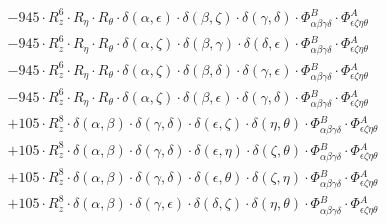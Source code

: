 \documentclass{article}
\begin{document}
\begin{equation}
\begin{array}{c}
 \\[0.2em] 		 - 945 \cdot R_{z}^{6} \cdot R_{\eta{}} \cdot R_{\theta{}} \cdot \delta{}\left(\alpha{}, \epsilon{}\right) \cdot \delta{}\left(\beta{}, \zeta{}\right) \cdot \delta{}\left(\gamma{}, \delta{}\right) \cdot \Phi{}^{B}_{\alpha{}\beta{}\gamma{}\delta{}} \cdot \Phi{}^{A}_{\epsilon{}\zeta{}\eta{}\theta{}} 
 \\[0.2em] 		 - 945 \cdot R_{z}^{6} \cdot R_{\eta{}} \cdot R_{\theta{}} \cdot \delta{}\left(\alpha{}, \zeta{}\right) \cdot \delta{}\left(\beta{}, \gamma{}\right) \cdot \delta{}\left(\delta{}, \epsilon{}\right) \cdot \Phi{}^{B}_{\alpha{}\beta{}\gamma{}\delta{}} \cdot \Phi{}^{A}_{\epsilon{}\zeta{}\eta{}\theta{}} 
 \\[0.2em] 		 - 945 \cdot R_{z}^{6} \cdot R_{\eta{}} \cdot R_{\theta{}} \cdot \delta{}\left(\alpha{}, \zeta{}\right) \cdot \delta{}\left(\beta{}, \delta{}\right) \cdot \delta{}\left(\gamma{}, \epsilon{}\right) \cdot \Phi{}^{B}_{\alpha{}\beta{}\gamma{}\delta{}} \cdot \Phi{}^{A}_{\epsilon{}\zeta{}\eta{}\theta{}} 
 \\[0.2em] 		 - 945 \cdot R_{z}^{6} \cdot R_{\eta{}} \cdot R_{\theta{}} \cdot \delta{}\left(\alpha{}, \zeta{}\right) \cdot \delta{}\left(\beta{}, \epsilon{}\right) \cdot \delta{}\left(\gamma{}, \delta{}\right) \cdot \Phi{}^{B}_{\alpha{}\beta{}\gamma{}\delta{}} \cdot \Phi{}^{A}_{\epsilon{}\zeta{}\eta{}\theta{}} 
 \\[0.2em] 		 + 105 \cdot R_{z}^{8} \cdot \delta{}\left(\alpha{}, \beta{}\right) \cdot \delta{}\left(\gamma{}, \delta{}\right) \cdot \delta{}\left(\epsilon{}, \zeta{}\right) \cdot \delta{}\left(\eta{}, \theta{}\right) \cdot \Phi{}^{B}_{\alpha{}\beta{}\gamma{}\delta{}} \cdot \Phi{}^{A}_{\epsilon{}\zeta{}\eta{}\theta{}} 
 \\[0.2em] 		 + 105 \cdot R_{z}^{8} \cdot \delta{}\left(\alpha{}, \beta{}\right) \cdot \delta{}\left(\gamma{}, \delta{}\right) \cdot \delta{}\left(\epsilon{}, \eta{}\right) \cdot \delta{}\left(\zeta{}, \theta{}\right) \cdot \Phi{}^{B}_{\alpha{}\beta{}\gamma{}\delta{}} \cdot \Phi{}^{A}_{\epsilon{}\zeta{}\eta{}\theta{}} 
 \\[0.2em] 		 + 105 \cdot R_{z}^{8} \cdot \delta{}\left(\alpha{}, \beta{}\right) \cdot \delta{}\left(\gamma{}, \delta{}\right) \cdot \delta{}\left(\epsilon{}, \theta{}\right) \cdot \delta{}\left(\zeta{}, \eta{}\right) \cdot \Phi{}^{B}_{\alpha{}\beta{}\gamma{}\delta{}} \cdot \Phi{}^{A}_{\epsilon{}\zeta{}\eta{}\theta{}} 
 \\[0.2em] 		 + 105 \cdot R_{z}^{8} \cdot \delta{}\left(\alpha{}, \beta{}\right) \cdot \delta{}\left(\gamma{}, \epsilon{}\right) \cdot \delta{}\left(\delta{}, \zeta{}\right) \cdot \delta{}\left(\eta{}, \theta{}\right) \cdot \Phi{}^{B}_{\alpha{}\beta{}\gamma{}\delta{}} \cdot \Phi{}^{A}_{\epsilon{}\zeta{}\eta{}\theta{}} 

\end{array}
\end{equation}
\end{document}
